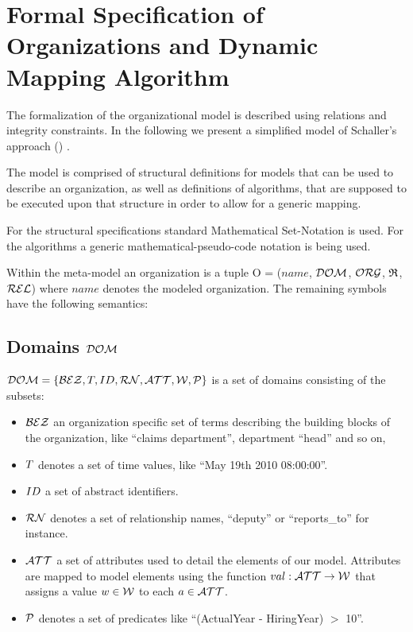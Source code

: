 \section{Formal Specification of Organizations and Dynamic Mapping Algorithm}

The formalization of the organizational model is described using relations and integrity constraints. In the following we present a simplified model of Schaller's approach (\cite{Schaller98}) .

The model is comprised of structural definitions for models that can be used to describe an organization, as well as definitions of algorithms, that are supposed to be executed upon that structure in order to allow for a generic mapping.

For the structural specifications standard Mathematical Set-Notation is used. For the algorithms a generic mathematical-pseudo-code notation is being used.

Within the meta-model an organization is a tuple O = ($name$, $\mathcal{DOM}$, $\mathcal{ORG}$, $\mathfrak{R}$, $\mathcal{REL}$) where $name$ denotes the modeled organization. The remaining symbols have the following semantics:

\subsection{Domains $\mathcal{DOM}$}
	$\mathcal{DOM} = \{ \mathcal{BEZ}, T, ID, \mathcal{RN}, \mathcal{ATT}, \mathcal{W}, \mathcal{P} \} $ is a set
	of domains consisting of the subsets:

	\begin{itemize}

	\item $\mathcal{BEZ}$ an organization specific set of terms describing the building blocks of the
	organization, like "`claims department"', department "`head"' and so on,

	\item $T$ denotes a set of time values, like ``May 19th 2010 08:00:00''.

	\item $ID$ a set of abstract identifiers.

	\item $\mathcal{RN}$ denotes a set of relationship names, "`deputy"' or "`reports\_to"' for instance.

	\item $\mathcal{ATT}$ a set of attributes used to detail the elements of our model. Attributes are mapped to model elements using the function  $val: \mathcal{ATT} \rightarrow \mathcal{W}$ that assigns a value $w \in \mathcal{W}$ to each
	$a \in \mathcal{ATT}$.

	\item	$\mathcal{P}$ denotes a set of predicates like "`(ActualYear - HiringYear) $>$ 10"'.

	\end{itemize}

